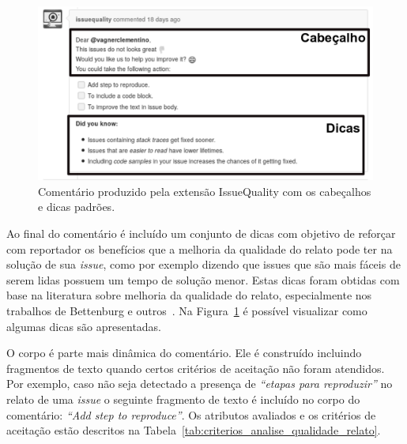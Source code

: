 \begin{figure}[htpb]
    \centering
    \includegraphics[width=0.8\linewidth]{chapter-implementacao-extensoes-fgrm/img/issue_original.png}
    \caption{Comentário produzido pela extensão IssueQuality com os cabeçalhos e
        dicas padrões.}
\label{fig:issue_original}
\end{figure}

Ao final do comentário é incluído um conjunto de dicas com objetivo de reforçar
com reportador os benefícios que a melhoria da qualidade do relato pode ter na
solução de sua \textit{issue}, como por exemplo dizendo que issues que são mais
fáceis de serem lidas possuem um tempo de solução menor. Estas dicas foram
obtidas com base na literatura sobre melhoria da qualidade do relato,
especialmente nos trabalhos de Bettenburg e outros~\cite{bettenburg2007quality,
    bettenburg2008makes}. Na Figura~\ref{fig:issue_original} é possível
visualizar como algumas dicas são apresentadas.

O corpo é parte mais dinâmica do comentário. Ele é construído incluindo
fragmentos de texto quando certos critérios de aceitação não foram atendidos.
Por exemplo, caso não seja detectado a presença de \textit{``etapas para
    reproduzir''} no relato de uma \textit{issue} o seguinte fragmento de texto é
incluído no corpo do comentário: \textit{``Add step to reproduce''}. Os
atributos avaliados e os critérios de aceitação estão descritos na
Tabela~\ref{tab:criterios_analise_qualidade_relato}.

